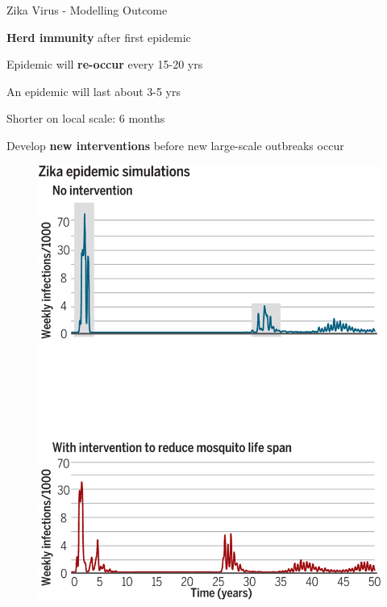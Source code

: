\documentclass[table]{beamer}\usepackage[]{graphicx}\usepackage[]{color}
\begin{document}
\begin{frame}[fragile]{Zika Virus - Modelling Outcome} %

\begin{minipage}{.52\textwidth}
\textbf{Herd immunity} after first epidemic  \par
\vspace{0.3cm}
Epidemic will \textbf{re-occur} every 15-20 yrs \par
\vspace{0.3cm}
An epidemic will last about 3-5 yrs \par
\vspace{0.1cm}
\hspace*{0.5cm}Shorter on local scale: 6 months \par
\vspace{0.3cm}
Develop \textbf{new interventions} before new large-scale outbreaks occur
\end{minipage} \hfill
\begin{minipage} {.45\textwidth}
\begin{figure}
  \centering
  \includegraphics[width=\textwidth,keepaspectratio]{Zika_results2.jpg}
\end{figure}
\end{minipage}\par
\vfill
{\scriptsize \cite{ferguson2016}}
\end{frame}
\end{document}
